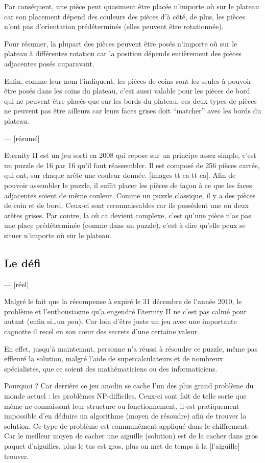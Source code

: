 	Par conséquent, une pièce peut quasiment être placée n'importe où sur le plateau car son placement dépend des couleurs des pièces d'à côté, de plus, les pièces n'ont pas d'orientation prédéterminés (elles peuvent être rotationnée).
	
	Pour résumer, la plupart des pièces peuvent être posés n'importe où sur le plateau à différentes rotation car la position dépends entièrement des pièces adjacentes posés auparavant. 
	
	Enfin, comme leur nom l'indiquent, les pièces de coins sont les seules à pouvoir être posés dans les coins du plateau, c'est aussi valable pour les pièces de bord qui ne peuvent être placés que sur les bords du plateau, ces deux types de pièces ne peuvent pas être ailleurs car leurs faces grises doit \enquote{matcher} avec les bords du plateau.
	
	
	--- [résumé]
	
	Eternity II est un jeu sorti en 2008 qui repose sur un principe assez simple, c'est un puzzle de 16 par 16 qu'il faut réassembler. Il est composé de 256 pièces carrés, qui ont, sur chaque arête une couleur donnée. [images tt ca tt ca]. Afin de pouvoir assembler le puzzle, il suffit placer les pièces de façon à ce que les faces adjacentes soient de même couleur. Comme un puzzle classique, il y a des pièces de coin et de bord. Ceux-ci sont reconnaissables car ils possèdent une ou deux arêtes grises. Par contre, la où ca devient complexe, c'est qu'une pièce n'as pas une place prédéterminée (comme dans un puzzle), c'est à dire qu'elle peux se situer n'importe où sur le plateau. 
	
	\newpage
	\subsection{Le défi}
	--- [réel]
	
	Malgré le fait que la récompense à expiré le 31 décembre de l'année 2010, le problème et l'enthousiasme qu'a engendré Eternity II ne c'est pas calmé pour autant (enfin si\dots un peu). Car loin d'être juste un jeu avec une importante cagnotte il recel en son c\oe ur des secrets d'une certaine valeur.
	
	En effet, jusqu'à maintenant, personne n'a réussi à résoudre ce puzzle, même pas effleuré la solution, malgré l'aide de supercalculateurs et de nombreux spécialistes, que ce soient des mathématiciens ou des informaticiens.
	
	Pourquoi ? Car derrière ce jeu anodin se cache l'un des plus grand problème du monde actuel : les problèmes NP-difficiles. Ceux-ci sont fait de telle sorte que même ne connaissant leur structure ou fonctionnement, il est pratiquement impossible d'en déduire un algorithme (moyen de résoudre) afin de trouver la solution. Ce type de problème est communément appliqué dans le chiffrement. Car le meilleur moyen de cacher une aiguille (solution) est de la cacher dans gros paquet d'aiguilles, plus le tas est gros, plus on met de temps à la [l'aiguille] trouver.
	

